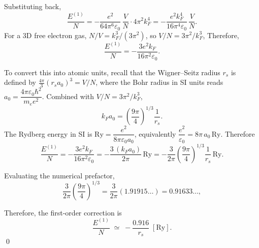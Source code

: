 \documentclass[a4paper,11pt]{article}
\begin{document}
Substituting back,
\begin{equation}
  \frac{E^{(1)}}{N} = -\frac{e^2}{64\pi^6 \varepsilon_0}\,\frac{V}{N}\cdot 4\pi^2 k_F^4 = -\frac{e^2 k_F^4}{16\pi^4 \varepsilon_0}\,\frac{V}{N}.
\end{equation}
For a 3D free electron gas, $N/V = k_F^3/(3\pi^2)$, so $V/N = 3\pi^2/k_F^3$, Therefore,
\begin{equation}
  \frac{E^{(1)}}{N} = -\frac{3 e^2 k_F}{16\pi^2 \varepsilon_0}.
\end{equation}

To convert this into atomic units, recall that the Wigner--Seitz radius $r_s$ is defined by $\tfrac{4\pi}{3}(r_s a_0)^3 = V/N$, where the Bohr radius in SI units reads $a_0 = \dfrac{4\pi\varepsilon_0 \hbar^2}{m_e e^2}$.  Combined with $V/N = 3\pi^2/k_F^3$,
\begin{equation}
  k_F a_0 = \left(\frac{9\pi}{4}\right)^{1/3}\frac{1}{r_s}.
\end{equation}
The Rydberg energy in SI is $\text{Ry} = \dfrac{e^2}{8\pi\varepsilon_0 a_0}$, equivalently $\dfrac{e^2}{\varepsilon_0} = 8\pi\, a_0\,\text{Ry}$.  Therefore
\begin{equation}
  \frac{E^{(1)}}{N} = -\frac{3 e^2 k_F}{16\pi^2 \varepsilon_0} = -\frac{3\,(k_F a_0)}{2\pi}\,\text{Ry} = -\frac{3}{2\pi}\!\left(\frac{9\pi}{4}\right)^{1/3}\!\frac{1}{r_s}\,\text{Ry}.
\end{equation}

Evaluating the numerical prefactor,
\begin{equation}
  \frac{3}{2\pi}\!\left(\frac{9\pi}{4}\right)^{1/3} = \frac{3}{2\pi}(1.91915\ldots) = 0.91633\ldots,
\end{equation}

Therefore, the first-order correction is
\begin{equation}
  \frac{E^{(1)}}{N}\;\simeq\;-\frac{0.916}{r_s}\;[\text{Ry}].
\end{equation}
\qed
\end{document}
